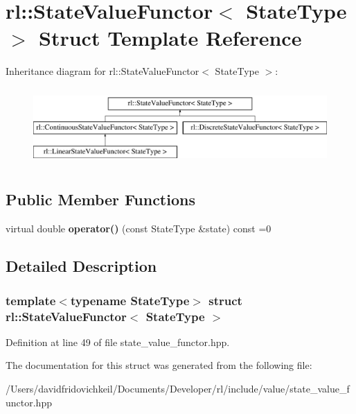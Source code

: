 \hypertarget{structrl_1_1_state_value_functor}{}\section{rl\+:\+:State\+Value\+Functor$<$ State\+Type $>$ Struct Template Reference}
\label{structrl_1_1_state_value_functor}
Inheritance diagram for rl\+:\+:State\+Value\+Functor$<$ State\+Type $>$\+:\begin{figure}[H]
\begin{center}
\leavevmode
\includegraphics[height=2.978723cm]{structrl_1_1_state_value_functor}
\end{center}
\end{figure}
\subsection*{Public Member Functions}
\begin{DoxyCompactItemize}
\item 
\hypertarget{structrl_1_1_state_value_functor_a99a5f669d5f15febec82b4f7bfa840dc}{}\label{structrl_1_1_state_value_functor_a99a5f669d5f15febec82b4f7bfa840dc} 
virtual double {\bfseries operator()} (const State\+Type \&state) const =0
\end{DoxyCompactItemize}


\subsection{Detailed Description}
\subsubsection*{template$<$typename State\+Type$>$\newline
struct rl\+::\+State\+Value\+Functor$<$ State\+Type $>$}



Definition at line 49 of file state\+\_\+value\+\_\+functor.\+hpp.



The documentation for this struct was generated from the following file\+:\begin{DoxyCompactItemize}
\item 
/\+Users/davidfridovichkeil/\+Documents/\+Developer/rl/include/value/state\+\_\+value\+\_\+functor.\+hpp\end{DoxyCompactItemize}
